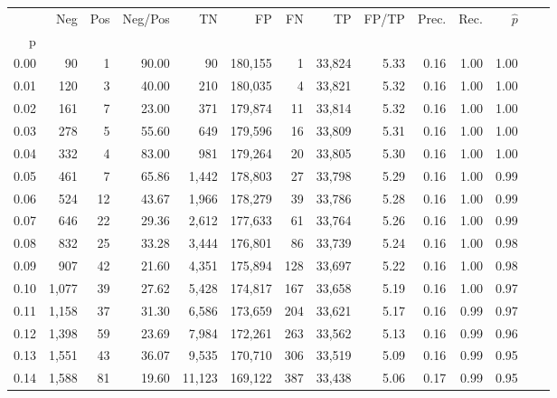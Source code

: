 \begin{tabular}{rrrrrrrrrrrrrr}
\toprule
{} &    Neg &  Pos & Neg/Pos &       TN &       FP &      FN &      TP & FP/TP & Prec. &  Rec. & $\hat{p}$ \\
p    &        &      &         &          &          &         &         &       &       &       &           \\
\midrule
0.00 &     90 &    1 &   90.00 &       90 &  180,155 &       1 &  33,824 &  5.33 &  0.16 &  1.00 &      1.00 \\
0.01 &    120 &    3 &   40.00 &      210 &  180,035 &       4 &  33,821 &  5.32 &  0.16 &  1.00 &      1.00 \\
0.02 &    161 &    7 &   23.00 &      371 &  179,874 &      11 &  33,814 &  5.32 &  0.16 &  1.00 &      1.00 \\
0.03 &    278 &    5 &   55.60 &      649 &  179,596 &      16 &  33,809 &  5.31 &  0.16 &  1.00 &      1.00 \\
0.04 &    332 &    4 &   83.00 &      981 &  179,264 &      20 &  33,805 &  5.30 &  0.16 &  1.00 &      1.00 \\
0.05 &    461 &    7 &   65.86 &    1,442 &  178,803 &      27 &  33,798 &  5.29 &  0.16 &  1.00 &      0.99 \\
0.06 &    524 &   12 &   43.67 &    1,966 &  178,279 &      39 &  33,786 &  5.28 &  0.16 &  1.00 &      0.99 \\
0.07 &    646 &   22 &   29.36 &    2,612 &  177,633 &      61 &  33,764 &  5.26 &  0.16 &  1.00 &      0.99 \\
0.08 &    832 &   25 &   33.28 &    3,444 &  176,801 &      86 &  33,739 &  5.24 &  0.16 &  1.00 &      0.98 \\
0.09 &    907 &   42 &   21.60 &    4,351 &  175,894 &     128 &  33,697 &  5.22 &  0.16 &  1.00 &      0.98 \\
0.10 &  1,077 &   39 &   27.62 &    5,428 &  174,817 &     167 &  33,658 &  5.19 &  0.16 &  1.00 &      0.97 \\
0.11 &  1,158 &   37 &   31.30 &    6,586 &  173,659 &     204 &  33,621 &  5.17 &  0.16 &  0.99 &      0.97 \\
0.12 &  1,398 &   59 &   23.69 &    7,984 &  172,261 &     263 &  33,562 &  5.13 &  0.16 &  0.99 &      0.96 \\
0.13 &  1,551 &   43 &   36.07 &    9,535 &  170,710 &     306 &  33,519 &  5.09 &  0.16 &  0.99 &      0.95 \\
0.14 &  1,588 &   81 &   19.60 &   11,123 &  169,122 &     387 &  33,438 &  5.06 &  0.17 &  0.99 &      0.95 \\

\end{tabular}
